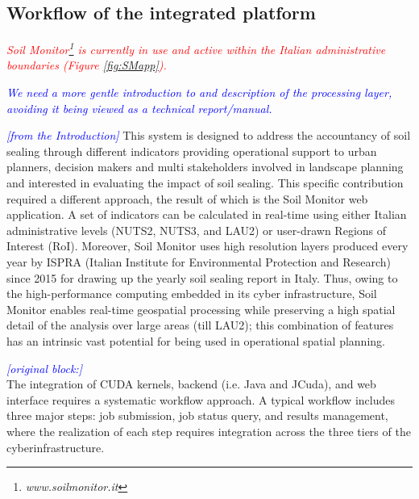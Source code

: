 \documentclass[APA,LATO1COL,doublespace]{WileyNJD-v2}
\newcommand{\toberevised}[1]{\emph{\textcolor{red}{#1}}} %
\newcommand{\update}[1]{\emph{\textcolor{blue}{#1}}}     %
\begin{document}
\subsection{Workflow of the integrated platform}

\toberevised{ Soil Monitor\footnote{\emph{www.soilmonitor.it}} is currently in use and active within the Italian administrative boundaries (Figure \ref{fig:SMapp}). }

\update{We need a more gentle introduction to and description of the processing layer, avoiding it being viewed as a technical report/manual.}

\update{[from the Introduction]}
This system is designed to address the accountancy of soil sealing through different indicators providing operational support to urban planners, decision makers and multi stakeholders involved in landscape planning and interested in evaluating the impact of soil sealing. 
This specific contribution required a different approach, the result of which is the Soil Monitor web application. 
A set of indicators can be calculated in real-time using either Italian administrative levels (NUTS2, NUTS3, and LAU2) or user-drawn Regions of Interest (RoI). 
Moreover, Soil Monitor uses high resolution layers produced every year by ISPRA (Italian Institute for Environmental Protection and Research) since 2015 for drawing up the yearly soil sealing report in Italy. 
Thus, owing to the high-performance computing embedded in its cyber infrastructure, Soil Monitor enables real-time geospatial processing while preserving a high spatial detail of the analysis over large areas (till LAU2); this combination of features has an intrinsic vast potential for being used in operational spatial planning. 

\update{[original block:]}\\
The integration of CUDA kernels, backend (i.e. Java and JCuda), and web interface requires a systematic workflow approach. 
A typical workflow includes three major steps: job submission, job status query, and results management, where the realization of each step requires integration across the three tiers of the cyberinfrastructure. 
\end{document}
